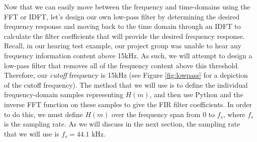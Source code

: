 Now that we can easily move between the frequency and time-domains using the FFT or IDFT, let's design our own low-pass filter by determining the desired frequency response and moving back to the time domain through an IDFT to calculate the filter coefficients that will provide the desired frequency response.  Recall, in our hearing test example, our project group was unable to hear any frequency information content above 15kHz.  As such, we will attempt to design a low-pass filter that removes all of the frequency content above this threshold.  Therefore, our \textit{cutoff} frequency is 15kHz (see Figure \ref{fig:lowpass} for a depiction of the cutoff frequency).  The method that we will use is to define the individual frequency-domain samples representing $H(m)$, and then use Python and the inverse FFT function on these samples to give the FIR filter coefficients.  In order to do this, we must define $H(m)$ over the frequency span from 0 to $f_s$, where $f_s$ is the sampling rate.  As we will discuss in the next section, the sampling rate that we will use is $f_s = 44.1$ kHz.         
  
 
